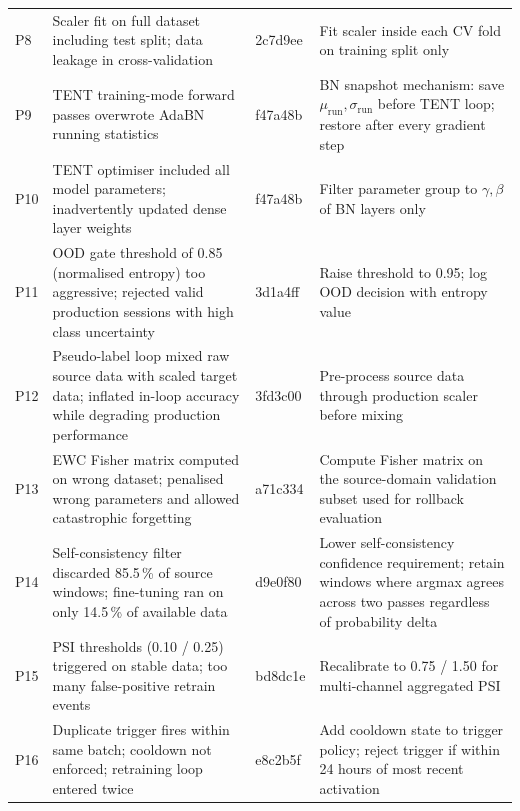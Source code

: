 \begin{longtable}{p{}p{}p{}p{}}
  P8 & Scaler fit on full dataset including test split;
       data leakage in cross-validation
     & 2c7d9ee
     & Fit scaler inside each CV fold on training split only \\[4pt]

  P9 & TENT training-mode forward passes overwrote AdaBN running statistics
     & f47a48b
     & BN snapshot mechanism: save $\mu_\text{run}, \sigma_\text{run}$ before
       TENT loop; restore after every gradient step \\[4pt]

  P10 & TENT optimiser included all model parameters; inadvertently updated
        dense layer weights
     & f47a48b
     & Filter parameter group to $\gamma, \beta$ of BN layers only \\[4pt]

  P11 & OOD gate threshold of 0.85 (normalised entropy) too aggressive;
        rejected valid production sessions with high class uncertainty
     & 3d1a4ff
     & Raise threshold to 0.95; log OOD decision with entropy value \\[4pt]

  P12 & Pseudo-label loop mixed raw source data with scaled target data;
        inflated in-loop accuracy while degrading production performance
     & 3fd3c00
     & Pre-process source data through production scaler before mixing \\[4pt]

  P13 & EWC Fisher matrix computed on wrong dataset;
        penalised wrong parameters and allowed catastrophic forgetting
     & a71c334
     & Compute Fisher matrix on the source-domain validation subset used
       for rollback evaluation \\[4pt]

  P14 & Self-consistency filter discarded 85.5\,\% of source windows;
        fine-tuning ran on only 14.5\,\% of available data
     & d9e0f80
     & Lower self-consistency confidence requirement; retain windows where
       argmax agrees across two passes regardless of probability delta \\[4pt]

  P15 & PSI thresholds (0.10 / 0.25) triggered on stable data;
        too many false-positive retrain events
     & bd8dc1e
     & Recalibrate to 0.75 / 1.50 for multi-channel aggregated PSI \\[4pt]

  P16 & Duplicate trigger fires within same batch; cooldown not enforced;
        retraining loop entered twice
     & e8c2b5f
     & Add cooldown state to trigger policy; reject trigger if within 24 hours
       of most recent activation \\[4pt]


\end{longtable}
